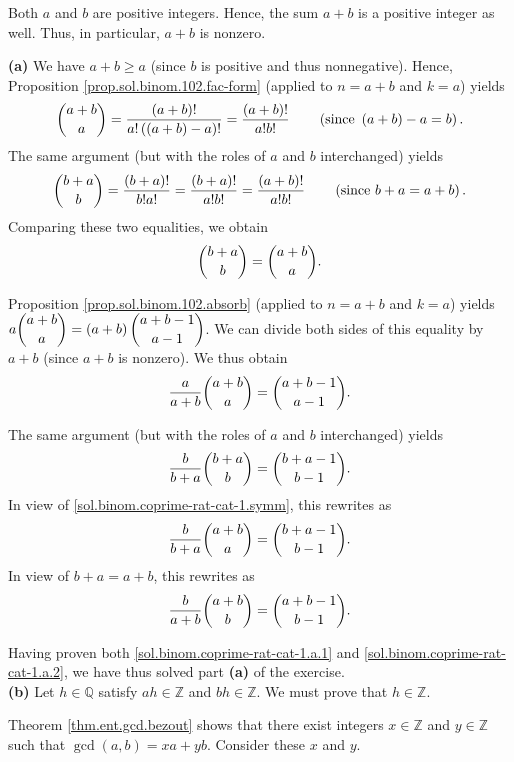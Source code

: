 \documentclass[paper=a4, fontsize=12pt]{scrartcl}%
\theoremstyle{plainsl}
\theoremstyle{definition}
\theoremstyle{remark}
\begin{document}
Both $a$ and $b$ are positive integers. Hence, the sum $a+b$ is a positive
integer as well. Thus, in particular, $a+b$ is nonzero.

\textbf{(a)} We have $a+b\geq a$ (since $b$ is positive and thus nonnegative).
Hence, Proposition \ref{prop.sol.binom.102.fac-form} (applied to $n=a+b$ and
$k=a$) yields
\[
\dbinom{a+b}{a}=\dfrac{\left(  a+b\right)  !}{a!\left(  \left(  a+b\right)
-a\right)  !}=\dfrac{\left(  a+b\right)  !}{a!b!}\qquad\left(  \text{since
}\left(  a+b\right)  -a=b\right)  .
\]
The same argument (but with the roles of $a$ and $b$ interchanged) yields
\[
\dbinom{b+a}{b}=\dfrac{\left(  b+a\right)  !}{b!a!}=\dfrac{\left(  b+a\right)
!}{a!b!}=\dfrac{\left(  a+b\right)  !}{a!b!}\qquad\left(  \text{since
}b+a=a+b\right)  .
\]
Comparing these two equalities, we obtain%
\begin{equation}
\dbinom{b+a}{b}=\dbinom{a+b}{a}.\label{sol.binom.coprime-rat-cat-1.symm}%
\end{equation}


Proposition \ref{prop.sol.binom.102.absorb} (applied to $n=a+b$ and $k=a$)
yields $a\dbinom{a+b}{a}=\left(  a+b\right)  \dbinom{a+b-1}{a-1}$. We can
divide both sides of this equality by $a+b$ (since $a+b$ is nonzero). We thus
obtain
\begin{equation}
\dfrac{a}{a+b}\dbinom{a+b}{a}=\dbinom{a+b-1}{a-1}.
\label{sol.binom.coprime-rat-cat-1.a.1}%
\end{equation}


The same argument (but with the roles of $a$ and $b$ interchanged) yields%
\[
\dfrac{b}{b+a}\dbinom{b+a}{b}=\dbinom{b+a-1}{b-1}.
\]
In view of \eqref{sol.binom.coprime-rat-cat-1.symm}, this rewrites as%
\[
\dfrac{b}{b+a}\dbinom{a+b}{a}=\dbinom{b+a-1}{b-1}.
\]
In view of $b+a=a+b$, this rewrites as%
\begin{equation}
\dfrac{b}{a+b}\dbinom{a+b}{b}=\dbinom{a+b-1}{b-1}.
\label{sol.binom.coprime-rat-cat-1.a.2}%
\end{equation}


Having proven both \eqref{sol.binom.coprime-rat-cat-1.a.1} and
\eqref{sol.binom.coprime-rat-cat-1.a.2}, we have thus solved part \textbf{(a)}
of the exercise. \\[0.4cm]

\textbf{(b)} Let $h\in\mathbb{Q}$ satisfy $ah\in\mathbb{Z}$ and $bh\in
\mathbb{Z}$. We must prove that $h\in\mathbb{Z}$.

Theorem \ref{thm.ent.gcd.bezout} shows that there exist integers
$x\in\mathbb{Z}$ and $y\in\mathbb{Z}$ such that $\gcd\left(  a,b\right)
=xa+yb$. Consider these $x$ and $y$.
\end{document}
